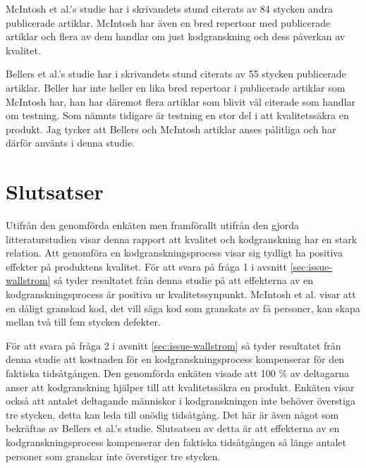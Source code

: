 McIntosh et al.'s \cite{mcintosh2014impact} studie har i skrivandets stund citerats av 84 stycken andra publicerade artiklar. McIntosh har även en bred repertoar med publicerade artiklar och flera av dem handlar om just kodgranskning och dess påverkan av kvalitet.

Bellers et al.'s \cite{beller2014modern} studie har i skrivandets stund citerats av 55 stycken publicerade artiklar. Beller har inte heller en lika bred repertoar i publicerade artiklar som McIntosh har, han har däremot flera artiklar som blivit väl citerade som handlar om testning. Som nämnts tidigare är testning en stor del i att kvalitetssäkra en produkt. Jag tycker att Bellers och McIntosh artiklar anses pålitliga och har därför använts i denna studie.

\section{Slutsatser}
\label{sec:conclusions-wallstrom}
Utifrån den genomförda enkäten men framförallt utifrån den gjorda litteraturstudien visar denna rapport att kvalitet och kodgranskning har en stark relation. Att genomföra en kodgranskningsprocess visar sig tydligt ha positiva effekter på produktens kvalitet. För att svara på fråga 1 i avsnitt \ref{sec:issue-wallstrom} så tyder resultatet från denna studie på att effekterna av en kodgranskningsprocess är positiva ur kvalitetssynpunkt. McIntosh et al. \cite{mcintosh2014impact} visar att en dåligt granskad kod, det vill säga kod som granskats av få personer, kan skapa mellan två till fem stycken defekter.

För att svara på fråga 2 i avsnitt \ref{sec:issue-wallstrom} så tyder resultatet från denna studie att kostnaden för en kodgranskningsprocess kompenserar för den faktiska tidsåtgången. Den genomförda enkäten visade att 100 \% av deltagarna anser att kodgranskning hjälper till att kvalitetssäkra en produkt. Enkäten visar också att antalet deltagande människor i kodgranskningen inte behöver överstiga tre stycken, detta kan leda till onödig tidsåtgång. Det här är även något som bekräftas av Bellers et al.'s \cite{beller2014modern} studie. Slutsatsen av detta är att effekterna av en kodgranskningsprocess kompenserar den faktiska tidsåtgången så länge antalet personer som granskar inte överstiger tre stycken.


